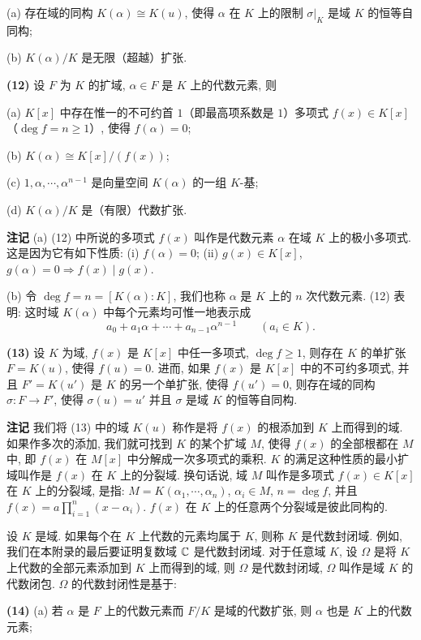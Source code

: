 (a) 存在域的同构 $K(\alpha)\cong K(u)$, 使得 $\alpha$ 在 $K$ 上的限制 $\sigma|_K$ 是域 $K$ 的恒等自同构;

(b) $K(\alpha)/K$ 是无限（超越）扩张.

\textbf{(12)} 设 $F$ 为 $K$ 的扩域, $\alpha\in F$ 是 $K$ 上的代数元素, 则

(a) $K[x]$ 中存在惟一的不可约首 $1$（即最高项系数是 $1$）多项式 $f(x)\in K[x]$（$\deg f=n\geqslant 1$）, 使得 $f(\alpha)=0$;

(b) $K(\alpha)\cong K[x]/(f(x))$;

(c) $1,\alpha,\cdots,\alpha^{n-1}$ 是向量空间 $K(\alpha)$ 的一组 $K$-基;

(d) $K(\alpha)/K$ 是（有限）代数扩张.

\textbf{注记} (a) (12) 中所说的多项式 $f(x)$ 叫作是代数元素 $\alpha$ 在域 $K$ 上的极小多项式. 这是因为它有如下性质: (i) $f(\alpha)=0$; (ii) $g(x)\in K[x]$, $g(\alpha)=0\Rightarrow f(x)\mid g(x)$.

(b) 令 $\deg f=n=[K(\alpha):K]$, 我们也称 $\alpha$ 是 $K$ 上的 $n$ 次代数元素. (12) 表明: 这时域 $K(\alpha)$ 中每个元素均可惟一地表示成
\[
  a_0+a_1\alpha+\cdots+a_{n-1}\alpha^{n-1}\qquad(a_i\in K).
\]

\textbf{(13)} 设 $K$ 为域, $f(x)$ 是 $K[x]$ 中任一多项式, $\deg f\geqslant 1$, 则存在 $K$ 的单扩张 $F=K(u)$, 使得 $f(u)=0$. 进而, 如果 $f(x)$ 是 $K[x]$ 中的不可约多项式, 并且 $F'=K(u')$ 是 $K$ 的另一个单扩张, 使得 $f(u')=0$, 则存在域的同构 $\sigma\colon F\to F'$, 使得 $\sigma(u)=u'$ 并且 $\sigma$ 是域 $K$ 的恒等自同构.

\textbf{注记} 我们将 (13) 中的域 $K(u)$ 称作是将 $f(x)$ 的根添加到 $K$ 上而得到的域. 如果作多次的添加, 我们就可找到 $K$ 的某个扩域 $M$, 使得 $f(x)$ 的全部根都在 $M$ 中, 即 $f(x)$ 在 $M[x]$ 中分解成一次多项式的乘积. $K$ 的满足这种性质的最小扩域叫作是 $f(x)$ 在 $K$ 上的分裂域. 换句话说, 域 $M$ 叫作是多项式 $f(x)\in K[x]$ 在 $K$ 上的分裂域, 是指: $M=K(\alpha_1,\cdots,\alpha_n)$, $\alpha_i\in M$, $n=\deg f$, 并且 $f(x)=a\prod_{i=1}^{n}(x-\alpha_i)$. $f(x)$ 在 $K$ 上的任意两个分裂域是彼此同构的.

设 $K$ 是域. 如果每个在 $K$ 上代数的元素均属于 $K$, 则称 $K$ 是代数封闭域. 例如, 我们在本附录的最后要证明复数域 $\mathbb{C}$ 是代数封闭域. 对于任意域 $K$, 设 $\Omega$ 是将 $K$ 上代数的全部元素添加到 $K$ 上而得到的域, 则 $\Omega$ 是代数封闭域, $\Omega$ 叫作是域 $K$ 的代数闭包. $\Omega$ 的代数封闭性是基于:

\textbf{(14)} (a) 若 $\alpha$ 是 $F$ 上的代数元素而 $F/K$ 是域的代数扩张, 则 $\alpha$ 也是 $K$ 上的代数元素;

